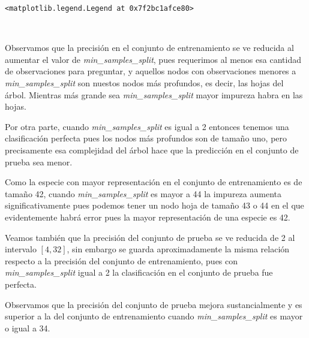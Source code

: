 \documentclass[11pt]{article}
\makeatletter
\newcommand{\boxspacing}{\kern\kvtcb@left@rule\kern\kvtcb@boxsep}
\newcommand{\prompt}[4]{
        \ttfamily\llap{{\color{#2}[#3]:\hspace{3pt}#4}}\vspace{-\baselineskip}
    }
\makeatother
\begin{document}
            \begin{tcolorbox}[breakable, size=fbox, boxrule=.5pt, pad at break*=1mm, opacityfill=0]
\prompt{Out}{outcolor}{11}{\boxspacing}
\begin{Verbatim}[commandchars=\\\{\}]
<matplotlib.legend.Legend at 0x7f2bc1afce80>
\end{Verbatim}
\end{tcolorbox}
        
    \begin{center}
    \end{center}
    { \hspace*{\fill} \\}
    
    Observamos que la precisión en el conjunto de entrenamiento se ve
reducida al aumentar el valor de \emph{min\_samples\_split}, pues
requerimos al menos esa cantidad de observaciones para preguntar, y
aquellos nodos con observaciones menores a \emph{min\_samples\_split}
son nuestos nodos más profundos, es decir, las hojas del árbol. Mientras
más grande sea \emph{min\_samples\_split} mayor impureza habra en las
hojas.

Por otra parte, cuando \emph{min\_samples\_split} es igual a 2 entonces
tenemos una clasificación perfecta pues los nodos más profundos son de
tamaño uno, pero precisamente esa complejidad del árbol hace que la
predicción en el conjunto de prueba sea menor.

Como la especie con mayor representación en el conjunto de entrenamiento
es de tamaño 42, cuando \emph{min\_samples\_split} es mayor a 44 la
impureza aumenta significativamente pues podemos tener un nodo hoja de
tamaño 43 o 44 en el que evidentemente habrá error pues la mayor
representación de una especie es 42.

Veamos también que la precisión del conjunto de prueba se ve reducida de
2 al intervalo \([4,32]\), sin embargo se guarda aproximadamente la
misma relación respecto a la precisión del conjunto de entrenamiento,
pues con \emph{min\_samples\_split} igual a 2 la clasificación en el
conjunto de prueba fue perfecta.

Observamos que la precisión del conjunto de prueba mejora
sustancialmente y es superior a la del conjunto de entrenamiento cuando
\emph{min\_samples\_split} es mayor o igual a 34.
\end{document}
